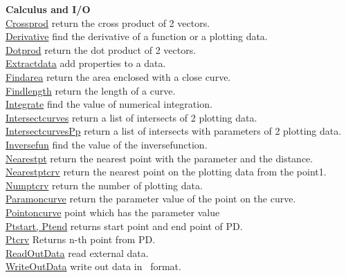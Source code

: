 \documentclass[papersize,a4paper,12pt]{article}
\begin{document}
\begin{tabbing}
{\bf Calculus and I/O} \> \\
\hyperlink{crossprod}{Crossprod} \> return the cross product of 2 vectors.\\
\hyperlink{derivative}{Derivative} \> find the derivative of a function or a plotting data.\\
\hyperlink{dotprod}{Dotprod} \> return the dot product of 2 vectors.\\
\hyperlink{extractdata}{Extractdata} \> add properties to a data.\\
\hyperlink{findarea}{Findarea} \> return the area enclosed with a close curve.\\
\hyperlink{findlength}{Findlength} \> return the length of a curve.\\
\hyperlink{integrate}{Integrate} \> find the value of numerical integration.\\
\hyperlink{intersectcurves}{Intersectcurves} \> return a list of intersects of 2 plotting data.\\
\hyperlink{intersectcurvesPp}{IntersectcurvesPp} \> return a list of intersects with parameters of 2 plotting data.\\
\hyperlink{inversefun}{Inversefun} \> find the value of the inversefunction.\\
\hyperlink{nearestpt}{Nearestpt} \> return the nearest point with the parameter and the distance.\\
\hyperlink{nearestptcrv}{Nearestptcrv} \> return the nearest point on the plotting data from the point1.\\
\hyperlink{numptcrv}{Numptcrv} \> return the number of plotting data.\\
\hyperlink{paramoncurve}{Paramoncurve} \> return the parameter value of the point on the curve.\\
\hyperlink{pointoncurve}{Pointoncurve} \> point which has the parameter value\\
\hyperlink{ptstart, ptend}{Ptstart, Ptend} \> returns start point and end point of PD.\\
\hyperlink{ptcrv}{Ptcrv} \> Returns n-th point from PD.\\
\hyperlink{readoutdata}{ReadOutData} \> read external data.\\
\hyperlink{writeoutdata}{WriteOutData} \> write out data in \ketcindy\ format.\\


\end{tabbing}
\end{document}
